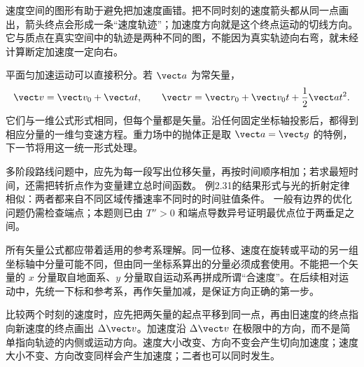 速度空间的图形有助于避免把加速度画错。把不同时刻的速度箭头都从同一点画出，箭头终点会形成一条“速度轨迹”；加速度方向就是这个终点运动的切线方向。它与质点在真实空间中的轨迹是两种不同的图，不能因为真实轨迹向右弯，就未经计算断定加速度一定向右。

平面匀加速运动可以直接积分。若 $\vect a$ 为常矢量，
\begin{equation}
 \vect v=\vect v_0+\vect at,
 \qquad
 \vect r=\vect r_0+\vect v_0t+\frac12\vect at^2.
\end{equation}
它们与一维公式形式相同，但每个量都是矢量。沿任何固定坐标轴投影后，都得到相应分量的一维匀变速方程。重力场中的抛体正是取 $\vect a=\vect g$ 的特例，下一节将用这一统一形式处理。

多阶段路线问题中，应先为每一段写出位移矢量，再按时间顺序相加；若求最短时间，还需把转折点作为变量建立总时间函数。
例2.31的结果形式与光的折射定律相似：两者都来自不同区域传播速率不同时的时间驻值条件。
一般有边界的优化问题仍需检查端点；本题则已由 $T''>0$ 和端点导数异号证明最优点位于两垂足之间。

所有矢量公式都应带着适用的参考系理解。同一位移、速度在旋转或平动的另一组坐标轴中分量可能不同，但由同一坐标系算出的分量必须成套使用。不能把一个矢量的 $x$ 分量取自地面系、$y$ 分量取自运动系再拼成所谓“合速度”。在后续相对运动中，先统一下标和参考系，再作矢量加减，是保证方向正确的第一步。

比较两个时刻的速度时，应先把两矢量的起点平移到同一点，再由旧速度的终点指向新速度的终点画出 $\Delta\vect v$。加速度沿 $\Delta\vect v$ 在极限中的方向，而不是简单指向轨迹的内侧或运动方向。速度大小改变、方向不变会产生切向加速度；速度大小不变、方向改变同样会产生加速度；二者也可以同时发生。

\AccelerationVectorDiagram

